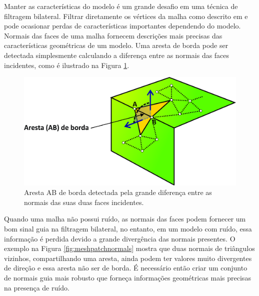 Manter as características do modelo é um grande desafio em uma técnica de filtragem bilateral. Filtrar diretamente os vértices da malha como descrito em \cite{fleishman2003bilateral} e \cite{jones2003non} pode ocasionar perdas de características importantes dependendo do modelo. Normais das faces de uma malha fornecem descrições mais precisas das características geométricas de um modelo. Uma aresta de borda pode ser detectada simplesmente calculando a diferença entre as normais das faces incidentes, como é ilustrado na Figura \ref{fig:meshsharpedge}. 

\begin{figure}[!h]
\captionsetup{width=\linewidth}
\centering
\includegraphics[width=\linewidth]{figuras/meshsharpedge.jpg}
\caption{Aresta AB de borda detectada pela grande diferença entre as normais das suas duas faces incidentes.}
\label{fig:meshsharpedge}
\end{figure}


Quando uma malha não possui ruído, as normais das faces podem fornecer um bom sinal guia na filtragem bilateral, no entanto, em um modelo com ruído, essa informação é perdida devido a grande divergência das normais presentes. O exemplo na Figura \ref{fig:meshpatchnormals} mostra que duas normais de triângulos vizinhos, compartilhando uma aresta, ainda podem ter valores muito divergentes de direção e essa aresta não ser de borda. É necessário então criar um conjunto de normais guia mais robusto que forneça informações geométricas mais precisas na presença de ruído.

